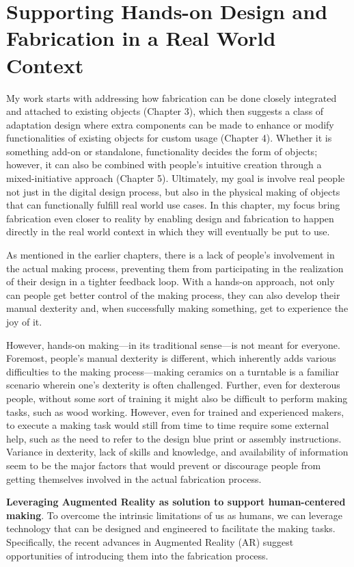 \chapter{Supporting Hands-on Design and Fabrication in a Real World Context}
My work starts with addressing how fabrication can be done closely integrated and attached to existing objects (Chapter 3), which then suggests a class of adaptation design where extra components can be made to enhance or modify functionalities of existing objects for custom usage (Chapter 4). Whether it is something add-on or standalone, functionality decides the form of objects; however, it can also be combined with people's intuitive creation through a mixed-initiative approach (Chapter 5). Ultimately, my goal is involve real people not just in the digital design process, but also in the physical making of objects that can functionally fulfill real world use cases. In this chapter, my focus bring fabrication even closer to reality by enabling design and fabrication to happen directly in the real world context in which they will eventually be put to use.

As mentioned in the earlier chapters, there is a lack of people's involvement in the actual making process, preventing them from participating in the realization of their design in a tighter feedback loop. With a hands-on approach, not only can people get better control of the making process, they can also develop their manual dexterity and, when successfully making something, get to experience the joy of it.

However, hands-on making---in its traditional sense---is not meant for everyone. Foremost, people's manual dexterity is different, which inherently adds various difficulties to the making process---making ceramics on a turntable is a familiar scenario wherein one's dexterity is often challenged. Further, even for dexterous people, without some sort of training it might also be difficult to perform making tasks, such as wood working. However, even for trained and experienced makers, to execute a making task would still from time to time require some external help, such as the need to refer to the design blue print or assembly instructions. Variance in dexterity, lack of skills and knowledge, and availability of information seem to be the major factors that would prevent or discourage people from getting themselves involved in the actual fabrication process.

\textbf{Leveraging Augmented Reality as solution to support human-centered making}. To overcome the intrinsic limitations of us as humans, we can leverage technology that can be designed and engineered to facilitate the making tasks. Specifically, the recent advances in Augmented Reality (AR) suggest opportunities of introducing them into the fabrication process.

